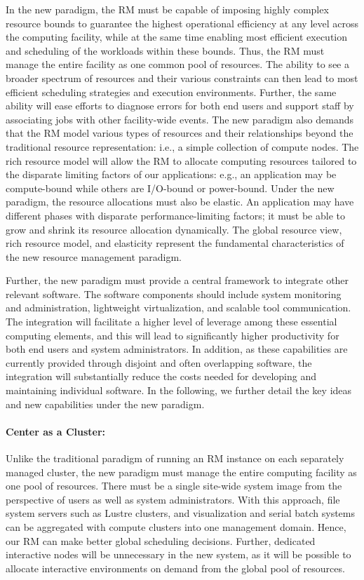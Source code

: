 \documentclass{article}
\begin{document}
In the new paradigm, the RM must be capable of imposing highly complex resource bounds
to guarantee the highest operational efficiency at any level
across the computing facility, while at the same time enabling most efficient execution
and scheduling of the workloads within these bounds.
Thus, the RM must manage the entire facility as one
common pool of resources. The ability to see a broader spectrum of resources 
and their various constraints can then lead to most efficient scheduling strategies
and execution environments. Further, the same ability will ease 
efforts to diagnose errors for both end users and support staff
by associating jobs with other facility-wide events. 
The new paradigm also demands that the RM model
various types of resources and their relationships beyond the traditional resource representation:
i.e., a simple collection of compute nodes.
The rich resource model will allow the RM to allocate computing resources
tailored to the disparate limiting factors of our applications: e.g.,
an application may be compute-bound while others are I/O-bound or power-bound.
Under the new paradigm, the resource allocations must also be elastic. 
An application may have different phases with disparate performance-limiting factors;
it must be able to grow and shrink its resource allocation dynamically. 
The global resource view, rich resource model, and elasticity represent
the fundamental characteristics of the new resource management paradigm.

Further, the new paradigm must provide a central framework to integrate
other relevant software. The software components should include   
system monitoring and administration, lightweight virtualization, 
and scalable tool communication. The integration will 
facilitate a higher level of leverage among these essential computing elements, 
and this will lead to significantly higher productivity 
for both end users and system administrators.  
In addition, as these capabilities are currently provided through disjoint
and often overlapping software, the integration will substantially reduce
the costs needed for developing and maintaining individual software.  
In the following, we further detail the key ideas and new capabilities 
under the new paradigm.


\paragraph{Center as a Cluster:}
Unlike the traditional paradigm of running an RM instance on each separately
managed cluster, 
the new paradigm must manage the
entire computing facility as one pool of resources. There must be a single site-wide 
system image from the perspective of users as well as system administrators.
With this approach, file system servers such as Lustre clusters, 
and visualization and serial batch systems can be aggregated
with compute clusters into one management domain. Hence,
our RM can make better global scheduling decisions. 
Further, dedicated interactive nodes will be unnecessary in the new system, as it
will be possible to allocate interactive environments on demand from the
global pool of resources.
\end{document}
